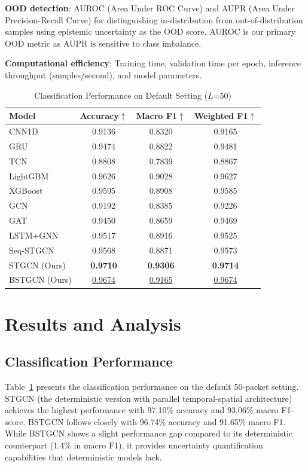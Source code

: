 \documentclass[lettersize,journal]{IEEEtran}
\begin{document}
\textbf{OOD detection}: AUROC (Area Under ROC Curve) and AUPR (Area Under Precision-Recall Curve) for distinguishing in-distribution from out-of-distribution samples using epistemic uncertainty as the OOD score. AUROC is our primary OOD metric as AUPR is sensitive to class imbalance.

\textbf{Computational efficiency}: Training time, validation time per epoch, inference throughput (samples/second), and model parameters.

\begin{table}[!t]
\caption{Classification Performance on Default Setting ($L$=50)\label{tab:classification}}
\centering
\begin{tabular}{lccc}
\toprule
\textbf{Model} & \textbf{Accuracy}$\uparrow$ & \textbf{Macro F1}$\uparrow$ & \textbf{Weighted F1}$\uparrow$ \\
\midrule
CNN1D    & 0.9136 & 0.8320 & 0.9165 \\
GRU      & 0.9474 & 0.8822 & 0.9481 \\
TCN      & 0.8808 & 0.7839 & 0.8867 \\
\midrule
LightGBM & 0.9626 & 0.9028 & 0.9627 \\
XGBoost  & 0.9595 & 0.8908 & 0.9585 \\
\midrule
GCN      & 0.9192 & 0.8385 & 0.9226 \\
GAT      & 0.9450 & 0.8659 & 0.9469 \\
\midrule
LSTM+GNN   & 0.9517 & 0.8916 & 0.9525 \\
Seq-STGCN  & 0.9568 & 0.8871 & 0.9573 \\
\midrule
STGCN (Ours)  & \textbf{0.9710} & \textbf{0.9306} & \textbf{0.9714} \\
BSTGCN (Ours) & \underline{0.9674} & \underline{0.9165} & \underline{0.9674} \\
\bottomrule
\end{tabular}
\end{table}


\section{Results and Analysis}

\subsection{Classification Performance}

Table~\ref{tab:classification} presents the classification performance on the default 50-packet setting. STGCN (the deterministic version with parallel temporal-spatial architecture) achieves the highest performance with 97.10\% accuracy and 93.06\% macro F1-score. BSTGCN follows closely with 96.74\% accuracy and 91.65\% macro F1. While BSTGCN shows a slight performance gap compared to its deterministic counterpart (1.4\% in macro F1), it provides uncertainty quantification capabilities that deterministic models lack.
\end{document}
